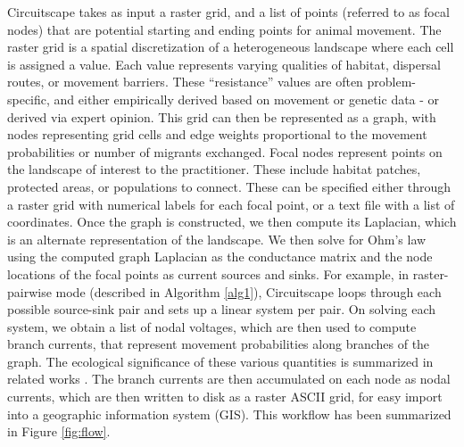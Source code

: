 \documentclass{juliacon}
\begin{document}
Circuitscape takes as input a raster grid, and a list of points (referred to as focal nodes) that are potential starting and ending points for animal movement. The raster grid is a spatial discretization of a heterogeneous landscape where each cell is assigned a value. Each value represents varying qualities of habitat, dispersal routes, or movement barriers. These “resistance” values are often problem-specific, and either empirically derived based on movement or genetic data - or derived via expert opinion. This grid can then be represented as a graph, with nodes representing grid cells and edge weights proportional to the movement probabilities or number of migrants exchanged. Focal nodes represent points on the landscape of interest to the practitioner. These include habitat patches, protected areas, or populations to connect. These can be specified either through a raster grid with numerical labels for each focal point, or a text file with a list of coordinates. Once the graph is constructed, we then compute its Laplacian, which is an alternate representation of the landscape. We then solve for Ohm’s law using the computed graph Laplacian as the conductance matrix and the node locations of the focal points as current sources and sinks. For example, in raster-pairwise mode (described in Algorithm \ref{alg1}), Circuitscape loops through each possible source-sink pair and sets up a linear system per pair. On solving each system, we obtain a list of nodal voltages, which are then used to compute branch currents, that represent movement probabilities along branches of the graph. The ecological significance of these various quantities is summarized in related works \cite{mcrae2008using}. The branch currents are then accumulated on each node as nodal currents, which are then written to disk as a raster ASCII grid, for easy import into a geographic information system (GIS). This workflow has been summarized in Figure \ref{fig:flow}. 
\end{document}
